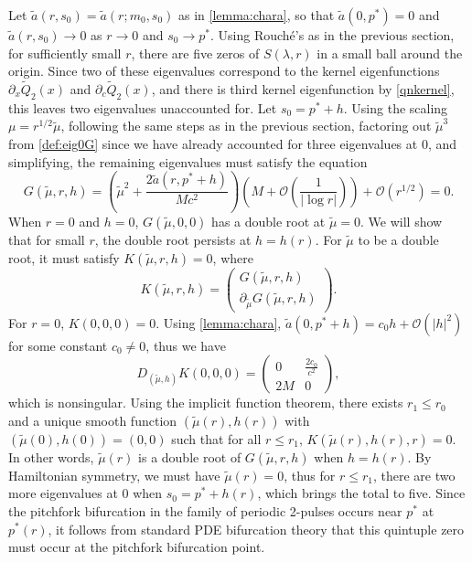 \documentclass[12pt]{elsarticle}
\theoremstyle{plain}
\theoremstyle{definition}
\theoremstyle{remark}
\numberwithin{theorem}{section}
\numberwithin{equation}{section}
\begin{document}
Let $\tilde{a}(r, s_0) = \tilde{a}(r; m_0, s_0)$ as in \cref{lemma:chara}, so that $\tilde{a}(0, p^*) = 0$ and $\tilde{a}(r, s_0) \rightarrow 0$ as $r \rightarrow 0$ and $s_0 \rightarrow p^*$. Using Rouch\'{e}'s as in the previous section, for sufficiently small $r$, there are five zeros of $S(\lambda, r)$ in a small ball around the origin. Since two of these eigenvalues correspond to the kernel eigenfunctions $\partial_x \tilde{Q}_2(x)$ and $\partial_c \tilde{Q}_2(x)$, and there is third kernel eigenfunction by \cref{qnkernel}, this leaves two eigenvalues unaccounted for. Let $s_0 = p^* + h$. Using the scaling $\mu = r^{1/2} \tilde{\mu}$, following the same steps as in the previous section, factoring out $\tilde{\mu}^3$ from \cref{def:eig0G} since we have already accounted for three eigenvalues at 0, and simplifying, the remaining eigenvalues must satisfy the equation
\begin{equation}\label{def:symmG}
G(\tilde{\mu}, r, h) = \left( \tilde{\mu}^2 + \frac{2 \tilde{a}(r, p^* + h)}{M c^2} \right)
\left( M + \mathcal{O}\left(\frac{1}{|\log r|} \right) \right)
 + \mathcal{O}\left( r^{1/2} \right) = 0.
\end{equation}
When $r = 0$ and $h = 0$, $G(\tilde{\mu}, 0, 0)$ has a double root at $\tilde{\mu} = 0$. We will show that for small $r$, the double root persists at $h = h(r)$. For $\tilde{\mu}$ to be a double root, it must satisfy $K(\tilde{\mu}, r, h) = 0$, where
\begin{equation*}
K(\tilde{\mu}, r, h) = 
\begin{pmatrix}G(\tilde{\mu}, r, h) \\ \partial_{\tilde{\mu}}G(\tilde{\mu}, r, h) \end{pmatrix}. 
\end{equation*}
For $r = 0$, $K(0, 0, 0) = 0$. Using \cref{lemma:chara}, $\tilde{a}(0, p^* + h) = c_0 h + \mathcal{O}(|h|^2)$ for some constant $c_0 \neq 0$, thus we have
\begin{equation*}
D_{(\tilde{\mu}, h)}K(0, 0, 0) = 
\begin{pmatrix}
0 & \frac{2 c_0}{c^2} \\
2M & 0
\end{pmatrix},
\end{equation*}
which is nonsingular. Using the implicit function theorem, there exists $r_1 \leq r_0$ and a unique smooth function $(\tilde{\mu}(r), h(r))$ with $(\tilde{\mu}(0), h(0)) = (0, 0)$ such that for all $r \leq r_1$, $K(\tilde{\mu}(r), h(r), r) = 0$. In other words, $\tilde{\mu}(r)$ is a double root of $G(\tilde{\mu}, r, h)$ when $h = h(r)$. By Hamiltonian symmetry, we must have $\tilde{\mu}(r) = 0$, thus for $r \leq r_1$, there are two more eigenvalues at 0 when $s_0 = p^* + h(r)$, which brings the total to five. Since the pitchfork bifurcation in the family of periodic 2-pulses occurs near $p^*$ at $p^*(r)$, it follows from standard PDE bifurcation theory that this quintuple zero must occur at the pitchfork bifurcation point.
\end{document}

